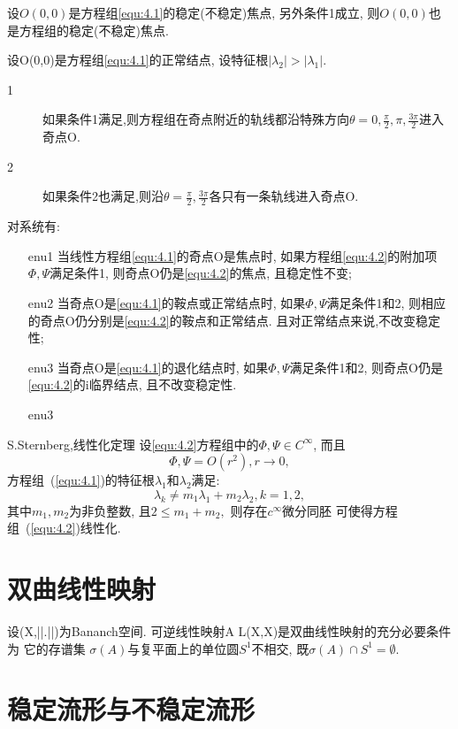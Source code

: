 \begin{theorem}
  设$O(0,0)$是方程组\ref{equ:4.1}的稳定(不稳定)焦点,
  另外条件1成立,
  则$O(0,0)$也是方程组的稳定(不稳定)焦点.
\end{theorem}

\begin{theorem}
  设O(0,0)是方程组\ref{equ:4.1}的正常结点,
  设特征根$|\lambda_2|>|\lambda_1|$.

  \begin{description}
  \item [1] 如果条件1满足,则方程组在奇点附近的轨线都沿特殊方向$\theta =0,\frac{\pi}{2},\pi ,\frac{3\pi}{2}$进入奇点O.
  \item [2] 如果条件2也满足,则沿$\theta=\frac{\pi}{2},\frac{3\pi}{2}$各只有一条轨线进入奇点O.
  \end{description}
\end{theorem}

\begin{theorem}
  对系统有:
  \begin{enumerate}
  \item[enu1] 当线性方程组\ref{equ:4.1}的奇点O是焦点时,
    如果方程组\ref{equ:4.2}的附加项$\Phi,\Psi$满足条件1,
    则奇点O仍是\ref{equ:4.2}的焦点,
    且稳定性不变;
  \item[enu2] 当奇点O是\ref{equ:4.1}的鞍点或正常结点时,
    如果$\Phi,\Psi$满足条件1和2,
    则相应的奇点O仍分别是\ref{equ:4.2}的鞍点和正常结点.
    且对正常结点来说,不改变稳定性;
  \item[enu3]当奇点O是\ref{equ:4.1}的退化结点时,
    如果$\Phi,\Psi$满足条件1和2,
    则奇点O仍是\ref{equ:4.2}的i临界结点,
    且不改变稳定性.
  \item[enu3]
  \end{enumerate}
\end{theorem}

\begin{theorem}{S.Sternberg,线性化定理}
  设\ref{equ:4.2}方程组中的$\Phi,\Psi \in C^\infty$,
  而且
  \begin{equation}
    \label{eq:0204}
\Phi,\Psi =O(r^2),r\to0,
  \end{equation}
  方程组~(\ref{equ:4.1})的特征根$\lambda_1$和$\lambda_2$满足:
  \begin{equation}
    \label{eq:0205}
    \lambda_k \neq m_1\lambda_1 +m_2\lambda_2,k=1,2,
  \end{equation}
  其中$m_1,m_2$为非负整数,
  且$2\leq m_1+m_2,$
  则存在$c^\infty$微分同胚
  可使得方程组~(\ref{equ:4.2})线性化.
\end{theorem}

\section{双曲线性映射}

\begin{theorem}
  设(X,||.||)为Bananch空间.
  可逆线性映射A \in L(X,X)是双曲线性映射的充分必要条件为
  它的存谱集 $\sigma(A)$与复平面上的单位圆$S^1$不相交,
  既$\sigma(A) \cap S^1 = \emptyset$.
\end{theorem}
\section{稳定流形与不稳定流形}